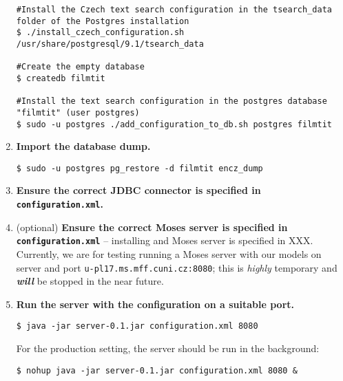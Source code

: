 \begin{enumerate}
\begin{lstlisting}
#Install the Czech text search configuration in the tsearch_data folder of the Postgres installation
$ ./install_czech_configuration.sh /usr/share/postgresql/9.1/tsearch_data

#Create the empty database
$ createdb filmtit

#Install the text search configuration in the postgres database "filmtit" (user postgres)
$ sudo -u postgres ./add_configuration_to_db.sh postgres filmtit
\end{lstlisting}
\vspace*{0.5em}

\item \textbf{Import the database dump.}
\vspace*{0.5em}
\begin{lstlisting}
$ sudo -u postgres pg_restore -d filmtit encz_dump
\end{lstlisting}
\vspace*{0.5em}

\item \textbf{Ensure the correct JDBC connector is specified in {\tt configuration.xml}.}
\item (optional) \textbf{Ensure the correct Moses server is specified in \texttt{configuration.xml}} -- installing and Moses server is specified in XXX. Currently, we are for testing running a Moses server with our models on server and port \texttt{u-pl17.ms.mff.cuni.cz:8080}; this is \emph{highly} temporary and \emph{\textbf{will}} be stopped in the near future.

\item \textbf{Run the server with the configuration on a suitable port.} 
\vspace*{0.5em}
\begin{lstlisting}
$ java -jar server-0.1.jar configuration.xml 8080
\end{lstlisting}
\vspace*{0.5em}

For the production setting, the server should be run in the background:
\vspace*{0.5em}
\begin{lstlisting}
$ nohup java -jar server-0.1.jar configuration.xml 8080 &
\end{lstlisting}
\vspace*{0.5em}






\end{enumerate}



